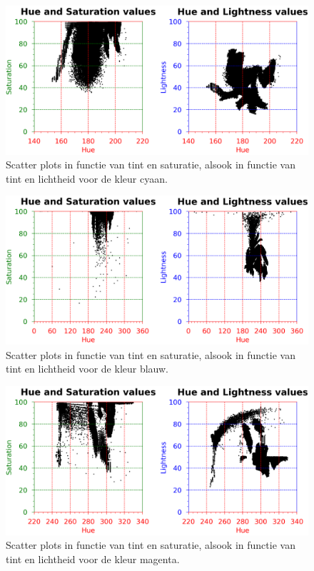 \begin{figure}[H]
	\center
	\includegraphics[width=\textwidth]{img/hslBlueGreen.png}
	\caption{Scatter plots in functie van tint en saturatie, alsook in functie van tint en lichtheid voor de kleur cyaan.}
	\label{hslBlueGreenPlot}
\end{figure}

\begin{figure}[H]
	\center
	\includegraphics[width=\textwidth]{img/hslBlue.png}
	\caption{Scatter plots in functie van tint en saturatie, alsook in functie van tint en lichtheid voor de kleur blauw.}
	\label{hslBluePlot}
\end{figure}

\begin{figure}[H]
	\center
	\includegraphics[width=\textwidth]{img/hslPink.png}
	\caption{Scatter plots in functie van tint en saturatie, alsook in functie van tint en lichtheid voor de kleur magenta.}
	\label{hslPinkPlot}
\end{figure}
